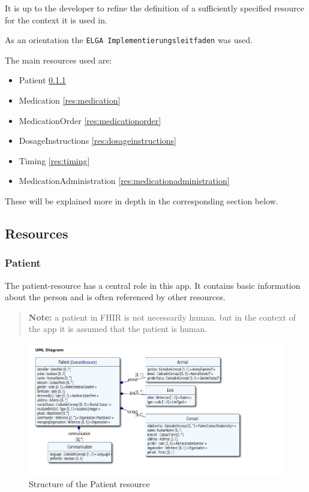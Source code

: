 \documentclass{article}
\begin{document}
It is up to the developer to refine the definition of a sufficiently
specified resource for the context it is used in.

As an orientation the \texttt{ELGA\ Implementierungsleitfaden} was used.

The main resources used are:
\begin{itemize}
\item
  Patient \ref{res:patient}
\item
  Medication \ref{res:medication}
\item
  MedicationOrder \ref{res:medicationorder}
\item
  DosageInstructions \ref{res:dosageinstructions}
\item
  Timing \ref{res:timing}
\item
  MedicationAdministration \ref{res:medicationadministration}
\end{itemize}

These will be explained more in depth in the corresponding
section below.

\subsection{Resources}\label{step3}

\subsubsection{Patient}\label{res:patient}
The patient-resource has a central role in this app. It contains basic
information about the person and is often referenced by other resources.
\begin{quote}
\textbf{Note:} a patient in FHIR is not necessarily human. but in the
context of the app it is assumed that the patient is human.
\end{quote}

\begin{figure}[H]
\centering
\includegraphics[width=\linewidth]{resources/FHIR/Patient/Patient-UML.png}
\caption{Structure of the Patient resource}
\label{fig:structure-patient}
\end{figure}
\end{document}

